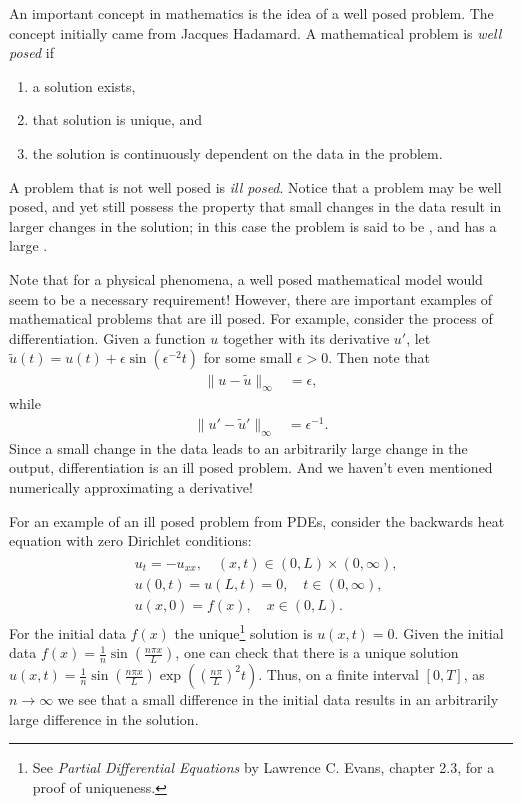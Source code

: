\label{lab:inverse_problems}

An important concept in mathematics is the idea of a well posed problem. The concept initially came from Jacques Hadamard. A mathematical problem is \textit{well posed} if 
\begin{enumerate}
	\item a solution exists, 
	\item that solution is unique, and 
	\item the solution is continuously dependent on the data in the problem. \label{inverse_problems:continuous_dependence}
\end{enumerate}
A problem that is not well posed is \textit{ill posed}. Notice that a problem may be well posed, and yet still possess the property that small changes in the data result in larger changes in the solution; in this case the problem is said to be , and has a large .

Note that for a physical phenomena, a well posed mathematical model would seem to be a necessary requirement! However, there are important examples of mathematical problems that are ill posed. For example, consider the process of differentiation. Given a function $u$ together with its derivative $u'$, let $\tilde{u}(t) = u(t) +  \epsilon \sin(\epsilon^{-2}t)$ for some small $\epsilon > 0$. Then note that 
\begin{align*}
	\|u-\tilde{u}\|_{\infty} &= \epsilon,
\end{align*}
while
\begin{align*}
	\|u'-\tilde{u}'\|_{\infty} &= \epsilon^{-1}.
\end{align*}
Since a small change in the data leads to an arbitrarily large change in the output, differentiation is an ill posed problem. And we haven't even mentioned numerically approximating a derivative!

For an example of an ill posed problem from PDEs, consider the backwards heat equation with zero Dirichlet conditions: 
\begin{align}
\begin{split}
	&{} u_t = -u_{xx}, \quad (x,t) \in (0,L)\times (0,\infty),\\
	&{} u(0,t) = u(L,t) = 0, \quad t \in (0,\infty),\\
	&{} u(x,0) = f(x), \quad x \in (0,L).
\end{split}
\end{align}
For the initial data $f(x)$ the unique\footnote{See \textit{Partial Differential Equations} by Lawrence C. Evans, chapter 2.3, for a proof of uniqueness.} solution is $u(x,t) = 0.$ 
Given the initial data $f(x) = \frac{1}{n}\sin ( \frac{n \pi x}{L})$, one can check that there is a unique solution $u(x,t) = \frac{1}{n}\sin ( \frac{n \pi x}{L})\exp ( (\frac{n \pi }{L})^2 t)$. 
Thus, on a finite interval $[0,T]$, as $n \to \infty$ we see that a small difference in the initial data results in an arbitrarily large difference in the solution.



